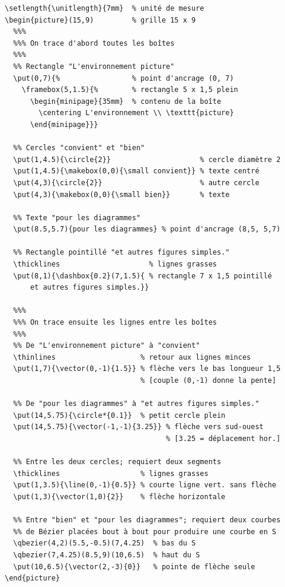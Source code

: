 \begingroup
  \small
\begin{lstlisting}
\setlength{\unitlength}{7mm}  % unité de mesure
\begin{picture}(15,9)         % grille 15 x 9
  %%%
  %%% On trace d'abord toutes les boîtes
  %%%
  %% Rectangle "L'environnement picture"
  \put(0,7){%                 % point d'ancrage (0, 7)
    \framebox(5,1.5){%        % rectangle 5 x 1,5 plein
      \begin{minipage}{35mm}  % contenu de la boîte
        \centering L'environnement \\ \texttt{picture}
      \end{minipage}}}

  %% Cercles "convient" et "bien"
  \put(1,4.5){\circle{2}}                     % cercle diamètre 2
  \put(1,4.5){\makebox(0,0){\small convient}} % texte centré
  \put(4,3){\circle{2}}                       % autre cercle
  \put(4,3){\makebox(0,0){\small bien}}       % texte

  %% Texte "pour les diagrammes"
  \put(8.5,5.7){pour les diagrammes} % point d'ancrage (8,5, 5,7)

  %% Rectangle pointillé "et autres figures simples."
  \thicklines                     % lignes grasses
  \put(8,1){\dashbox{0.2}(7,1.5){ % rectangle 7 x 1,5 pointillé
      et autres figures simples.}}

  %%%
  %%% On trace ensuite les lignes entre les boîtes
  %%%
  %% De "L'environnement picture" à "convient"
  \thinlines                    % retour aux lignes minces
  \put(1,7){\vector(0,-1){1.5}} % flèche vers le bas longueur 1,5
                                % [couple (0,-1) donne la pente]

  %% De "pour les diagrammes" à "et autres figures simples."
  \put(14,5.75){\circle*{0.1}}  % petit cercle plein
  \put(14,5.75){\vector(-1,-1){3.25}} % flèche vers sud-ouest
                                      % [3.25 = déplacement hor.]

  %% Entre les deux cercles; requiert deux segments
  \thicklines                   % lignes grasses
  \put(1,3.5){\line(0,-1){0.5}} % courte ligne vert. sans flèche
  \put(1,3){\vector(1,0){2}}    % flèche horizontale

  %% Entre "bien" et "pour les diagrammes"; requiert deux courbes
  %% de Bézier placées bout à bout pour produire une courbe en S
  \qbezier(4,2)(5.5,-0.5)(7,4.25)  % bas du S
  \qbezier(7,4.25)(8.5,9)(10,6.5)  % haut du S
  \put(10,6.5){\vector(2,-3){0}}   % pointe de flèche seule
\end{picture}
\end{lstlisting}
\endgroup


